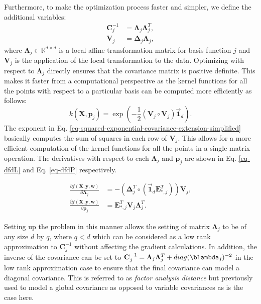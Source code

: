 \documentclass[useAMS,usenatbib,fleqn]{mn2e}
\begin{document}
Furthermore, to make the optimization process faster and simpler, we define the additional variables:
\begin{subequations}
\begin{align}
\label{eq-Cinv}
\mathbf{C}_{j}^{-1} &= \mathbf\Lambda_{j}\mathbf\Lambda_{j}^{T},\\
\label{eq-V_j}
\mathbf{V}_{j} &= \mathbf\Delta_{j}\mathbf\Lambda_{j},
\end{align}
\end{subequations}
where $\mathbf\Lambda_{j} \in \mathbb{R}^{d\times d}$ is a local affine transformation matrix for basis function $j$ and $\mathbf{V}_{j}$ is the application of the local transformation to the data. Optimizing with respect to $\mathbf\Lambda_{j}$ directly ensures that the covariance matrix is positive definite. This makes it faster from a computational perspective as the kernel functions for all the points with respect to a particular basis can be computed more efficiently as follows:
\begin{equation}
\label{eq-squared-exponential-covariance-extension-simplified}
k(\mathbf{X},\mathbf{p}_{j}) = \exp{\left(-\frac{1}{2}\left(\mathbf{V}_{j}\circ \mathbf{V}_{j}\right)\vec{\mathbf{1}}_{d}\right)}.
\end{equation}
The exponent in Eq. \eqref{eq-squared-exponential-covariance-extension-simplified} basically computes the sum of squares in each row of $\mathbf{V}_{j}$. This allows for a more efficient computation of the kernel functions for all the points in a single matrix operation. The derivatives with respect to each $\mathbf\Lambda_{j}$ and $\mathbf{p}_{j}$ are shown in Eq. \eqref{eq-dfdL} and Eq. \eqref{eq-dfdP} respectively.

\begin{subequations}
\begin{align}
\label{eq-dfdL}
\frac{\partial f(\mathbf{X},\mathbf{y},\mathbf{w})}{\partial \mathbf\Lambda_{j}} &= -\left( \mathbf\Delta_{j}^{T}\circ \left(\vec{\mathbf{1}}_{d}\mathbf{E}_{*,j}^{T}\right) \right)\mathbf{V}_{j},\\
\label{eq-dfdP}
\frac{\partial f(\mathbf{X},\mathbf{y},\mathbf{w})}{\partial \mathbf{p}_{j}} &= \mathbf{E}_{*,j}^{T}\mathbf{V}_{j}\mathbf\Lambda_{j}^{T}.
\end{align}
\end{subequations}


Setting up the problem in this manner allows the setting of matrix $\mathbf\Lambda_{j}$ to be of any size $d$ by $q$, where $q<d$ which can be considered as a low rank approximation to $\mathbf{C}_{j}^{-1}$ without affecting the gradient calculations. In addition, the inverse of the covariance can be set to $\mathbf{C}_{j}^{-1}=\mathbf\Lambda_{j}\mathbf\Lambda_{j}^{T}+diag(\blambda_{j})^{-2}$ in the low rank approximation case to ensure that the final covariance can model a diagonal covariance. This is referred to as \emph{factor analysis distance} \citep[p. 107]{rasmussen2006gaussian} but previously used to model a global covariance as opposed to variable covariances as is the case here.
\end{document}
